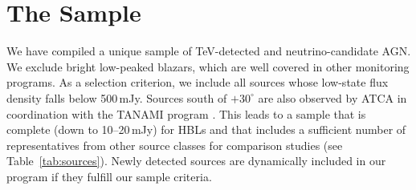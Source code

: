 \documentclass[a4paper,11pt]{article}
\begin{document}
\section{The Sample}
\noindent
We have compiled a unique sample of TeV-detected and neutrino-candidate AGN. We  exclude bright low-peaked blazars, which are well covered in
other monitoring programs. As a selection criterion, we include all sources whose low-state flux density falls below 500\,mJy.
Sources south of $+30^\circ$ are also observed by ATCA in coordination with the TANAMI program \cite{Stevens2012}.
This leads to a sample that is complete (down to 10--20\,mJy) for HBLs and that includes a sufficient number of representatives from other source classes for comparison studies (see Table~\ref{tab:sources}). 
Newly detected sources are dynamically included  in our program if they fulfill our sample criteria.
\end{document}

